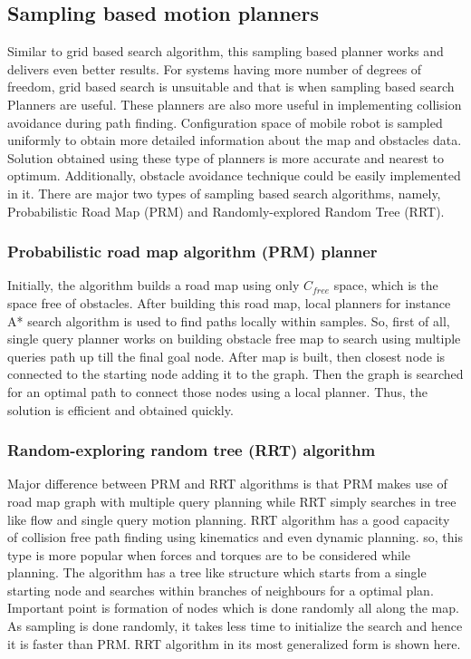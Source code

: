 \documentclass[12pt]{article}
\begin{document}
\subsection{Sampling based motion planners}
Similar to grid based search algorithm, this sampling based planner works and delivers even better results. For systems having more number of degrees of freedom, grid based search is unsuitable and that is when sampling based search Planners are useful. These planners are also more useful in implementing collision avoidance during path finding. Configuration space of mobile robot is sampled uniformly to obtain more detailed information about the map and obstacles data. Solution obtained using these type of planners is more accurate and nearest to optimum. Additionally, obstacle avoidance technique could be easily implemented in it. There are major two types of sampling based search algorithms, namely, Probabilistic Road Map (PRM) and Randomly-explored Random Tree (RRT).
\subsubsection{Probabilistic road map algorithm (PRM) planner}
Initially, the algorithm builds a road map using only $C_{free}$ space, which is the space free of obstacles. After building this road map, local planners for instance A* search algorithm is used to find paths locally within samples. So, first of all, single query planner works on building obstacle free map to search using multiple queries path up till the final goal node. After map is built, then closest node is connected to the starting node adding it to the graph. Then the graph is searched for an optimal path to connect those nodes using a local planner. Thus, the solution is efficient and obtained quickly.  
\subsubsection{Random-exploring random tree (RRT) algorithm}
Major difference between PRM and RRT algorithms is that PRM makes use of road map graph with multiple query planning while RRT simply searches in tree like flow and single query motion planning. RRT algorithm has a good capacity of collision free path finding using kinematics and even dynamic planning. so, this type is more popular when forces and torques are to be considered while planning. The algorithm has a tree like structure which starts from a single starting node and searches within branches of neighbours for a optimal plan. Important point is formation of nodes which is done randomly all along the map. As sampling is done randomly, it takes less time to initialize the search and hence it is faster than PRM. RRT algorithm in its most generalized form is shown here.
\end{document}
